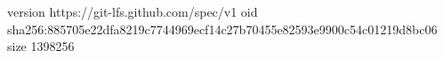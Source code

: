 version https://git-lfs.github.com/spec/v1
oid sha256:885705e22dfa8219c7744969ecf14c27b70455e82593e9900c54c01219d8bc06
size 1398256
